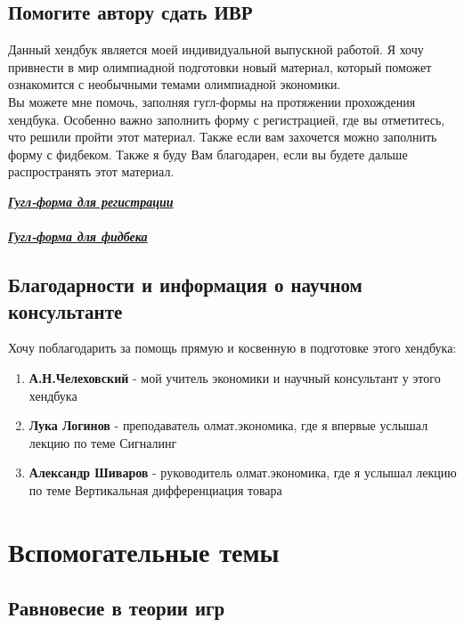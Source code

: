 \section{Помогите автору сдать ИВР}
\indent\setlength{\parindent}{1em}Данный хендбук является моей индивидуальной выпускной работой. Я хочу привнести в мир олимпиадной подготовки новый материал, который поможет ознакомится с необычными темами олимпиадной экономики.\\
\indent\setlength{\parindent}{1em}Вы можете мне помочь, заполняя гугл-формы на протяжении прохождения хендбука. Особенно важно заполнить форму с регистрацией, где вы отметитесь, что решили пройти этот материал. Также если вам захочется можно заполнить форму с фидбеком. Также я буду Вам благодарен, если вы будете дальше распространять этот материал.\\
\begin{center}
    \textbf{\textit{\href{https://forms.gle/bW7CD2zcdUhnbFnR7}{Гугл-форма для регистрации}}}\\\\
    \textbf{\textit{\href{https://forms.gle/31gene8PMRuqCLvr9}{Гугл-форма для фидбека}}}
\end{center}

\section{Благодарности и информация о научном консультанте}
\indent\setlength{\parindent}{1em}Хочу поблагодарить за помощь прямую и косвенную в подготовке этого хендбука:
\begin{enumerate}
    \item \textbf{А.Н.Челеховский} - мой учитель экономики и научный консультант у этого хендбука
    \item \textbf{Лука Логинов} - преподаватель олмат.экономика, где я впервые услышал лекцию по теме Сигналинг
    \item \textbf{Александр Шиваров} - руководитель олмат.экономика, где я услышал лекцию по теме Вертикальная дифференциация товара
\end{enumerate}



\chapter{Вспомогательные темы}


\section{Равновесие в теории игр}

